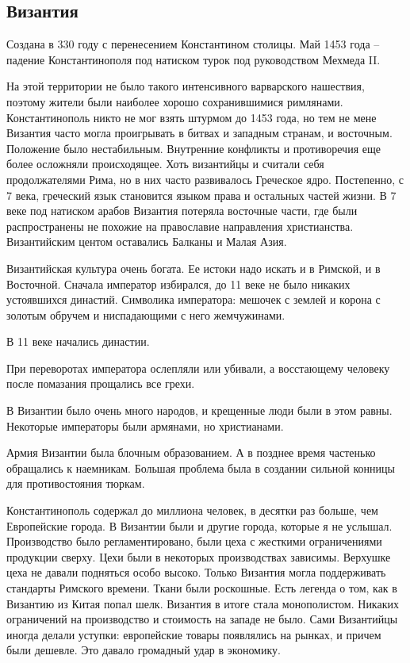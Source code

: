 \documentclass[a4paper, 12pt]{article}
\begin{document}
\begin{multicols}{2}
\subsection{Византия}
Создана в 330 году с перенесением Константином столицы.
Май 1453 года -- падение Константинополя под натиском турок под руководством Мехмеда II. 

На этой территории не было такого интенсивного варварского нашествия, поэтому жители были наиболее хорошо сохранившимися римлянами. Константинополь никто не мог взять штурмом до 1453 года, но тем не мене Византия часто могла проигрывать в битвах и западным странам, и восточным. Положение было нестабильным. Внутренние конфликты и противоречия еще более осложняли происходящее. Хоть византийцы и считали себя продолжателями Рима, но в них часто развивалось Греческое ядро. Постепенно, с 7 века, греческий язык становится языком права и остальных частей жизни. В 7 веке под натиском арабов Византия потеряла восточные части, где были распространены не похожие на православие направления христианства. Византийским центом оставались Балканы и Малая Азия. 

Византийская культура очень богата. Ее истоки надо искать и в Римской, и в Восточной. Сначала император избирался, до 11 веке не было никаких устоявшихся династий. Символика императора: мешочек с землей и корона с золотым обручем и ниспадающими с него жемчужинами. 

В 11 веке начались династии. 

При переворотах императора ослепляли или убивали, а восстающему человеку после помазания прощались все грехи. 

В Византии было очень много народов, и крещенные люди были в этом равны. Некоторые императоры были армянами, но христианами. 

Армия Византии была блочным образованием. А в позднее время частенько обращались к наемникам. Большая проблема была в создании сильной конницы для противостояния тюркам. 

Константинополь содержал до миллиона человек, в десятки раз больше, чем Европейские города. В Византии были и другие города, которые я не услышал. Производство было регламентировано, были цеха с жесткими ограничениями продукции сверху. Цехи были в некоторых производствах зависимы. Верхушке цеха не давали подняться особо высоко. Только Византия могла поддерживать стандарты Римского времени. Ткани были роскошные. Есть легенда о том, как в Византию из Китая попал шелк. Византия в итоге стала монополистом. Никаких ограничений на производство и стоимость на западе не было. Сами Византийцы иногда делали уступки: европейские товары появлялись на рынках, и причем были дешевле. Это давало громадный удар в экономику. 


\end{multicols}
\end{document}
